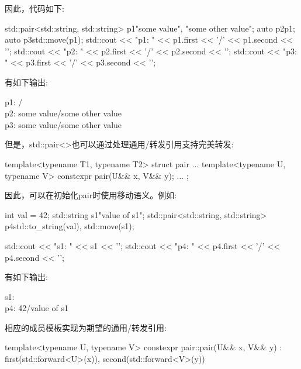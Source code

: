 因此，代码如下:\par

\begin{codebox}[cpp]
std::pair<std::string, std::string> p1{"some value", "some other value"};
auto p2{p1};
auto p3{std::move(p1)};
std::cout << "p1: " << p1.first << '/' << p1.second << '\n';
std::cout << "p2: " << p2.first << '/' << p2.second << '\n';
std::cout << "p3: " << p3.first << '/' << p3.second << '\n';
\end{codebox}

有如下输出:\par

\begin{myOutput}
p1: / \\
p2: some value/some other value \\
p3: some value/some other value
\end{myOutput}

但是，std::pair<>也可以通过处理通用/转发引用支持完美转发:\par

\begin{codebox}[cpp]
template<typename T1, typename T2>
struct pair {
  ...
  template<typename U, typename V> constexpr pair(U&& x, V&& y);
  ...
};
\end{codebox}

因此，可以在初始化pair时使用移动语义。例如:\par

\begin{codebox}[cpp]
int val = 42;
std::string s1{"value of s1"};
std::pair<std::string, std::string> p4{std::to_string(val), std::move(s1)};

std::cout << "s1: " << s1 << '\n';
std::cout << "p4: " << p4.first << '/' << p4.second << '\n';
\end{codebox}

有如下输出:\par

\begin{myOutput}
s1: \\
p4: 42/value of s1
\end{myOutput}

相应的成员模板实现为期望的通用/转发引用:\par

\begin{codebox}[cpp]
template<typename U, typename V>
constexpr pair::pair(U&& x, V&& y)
: first(std::forward<U>(x)), second(std::forward<V>(y)) {
}
\end{codebox}


